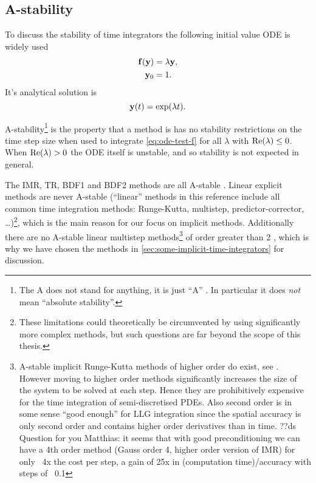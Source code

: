 \subsection{A-stability}
\label{sec:A-stability}

To discuss the stability of time integrators the following initial value ODE is widely used
\begin{equation}
  \begin{aligned}
    {\mathbf{f}{\left( \mathbf{y}\right)}} &= \lambda \mathbf{y}, \\
    \mathbf{y}_0 &= 1.
    \label{eq:ode-test-f}
  \end{aligned} 
\end{equation}
It's analytical solution is
\begin{equation}
  \mathbf{y}(t) = \exp(\lambda t).
\end{equation}

A-stability\footnote{The A does not stand for anything, it is just ``A'' \cite[40]{HairerWanner}. In particular it does \emph{not} mean ``absolute stability''.} is the property that a method is has no stability restrictions on the time step size when used to integrate \cref{eq:ode-test-f} for all $\lambda$ with $\operatorname{Re}(\lambda) \leq 0$.
When $\operatorname{Re}(\lambda) > 0$ the ODE itself is unstable, and so stability is not expected in general.

The IMR, TR, BDF1 and BDF2 methods are all A-stable \cite[pgs. 43, 251]{HairerWanner}.
Linear explicit methods are never A-stable \cite{Nevanlinna1974} (``linear'' methods in this reference include all common time integration methods: Runge-Kutta, multistep, predictor-corrector, \ldots)\footnote{These limitations could theoretically be circumvented by using significantly more complex methods, but such questions are far beyond the scope of this thesis.}, which is the main reason for our focus on implicit methods.
Additionally there are no A-stable linear multistep methods\footnote{A-stable implicit Runge-Kutta methods of higher order do exist, see \eg \cite[73]{HairerWanner}.
However moving to higher order methods significantly increases the size of the system to be solved at each step. Hence they are prohibitively expensive for the time integration of semi-discretised PDEs.
Also second order is in some sense ``good enough'' for LLG integration since the spatial accuracy is only second order and contains higher order derivatives than in time.
??ds Question for you Matthias: it seems that with good preconditioning we can have \eg a 4th order method (Gauss order 4, higher order version of IMR) for only ~4x the cost per step, a gain of 25x in (computation time)/accuracy with steps of ~0.1} of order greater than 2 \cite[261]{GreshoSani}, which is why we have chosen the  methods in \cref{sec:some-implicit-time-integrators} for discussion.

